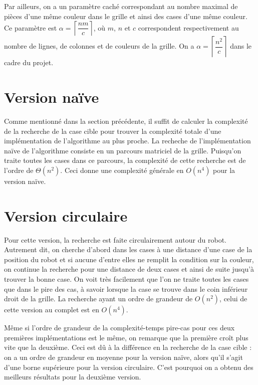 \documentclass[12pt,a4paper]{article}
\begin{document}
Par ailleurs, on a un param\`etre cach\'e correspondant au nombre maximal de 
pi\`eces d'une m\^eme couleur dans le grille et ainsi des cases d'une m\^eme 
couleur. Ce param\`etre est $\alpha = \left \lceil \dfrac{nm}{c} \right 
\rceil$, o\`u $m$, $n$ et $c$ correspondent respectivement au nombre de lignes, 
de colonnes et de couleurs de la grille. On a $\alpha = \left \lceil 
\dfrac{n^2}{c} \right \rceil$ dans le cadre du projet.

\section{Version na\"ive}
Comme mentionn\'e dans la section pr\'ec\'edente, il suffit de 
calculer la complexit\'e de la recherche de la case cible pour trouver la 
complexit\'e totale d'une impl\'ementation de l'algorithme au plus proche.
La recheche de l'impl\'ementation na\"ive de l'algorithme consiste en un 
parcours matriciel de la grille. Puisqu'on traite toutes les cases dans ce 
parcours, la complexit\'e de cette recherche est de l'ordre de $\Theta(n^2)$. 
Ceci donne une complexit\'e g\'en\'erale en $O(n^4)$ pour la version na\"ive.

\section{Version circulaire}
Pour cette version, la recherche est faite circulairement autour du robot. 
Autrement dit, on cherche d'abord dans les cases \`a une distance d'une case de 
la position du robot et si aucune d'entre elles ne remplit la condition 
sur la couleur, on continue la recherche pour une distance de deux 
cases et ainsi de suite jusqu'\`a trouver la bonne case. On voit tr\`es 
facilement que l'on ne traite toutes les cases que dans le pire des cas, 
\`a savoir lorsque la case se trouve dans le coin inf\'erieur droit de la 
grille. La recherche ayant un ordre de grandeur de $O(n^2)$, celui de cette 
version au complet est en $O(n^4)$.

M\^eme si l'ordre de grandeur de la complexit\'e-temps pire-cas pour ces deux 
premi\`eres impl\'ementations est le m\^eme, on remarque que la premi\`ere 
cro\^it plus vite que la deuxi\`eme. Ceci est d\^u \`a la diff\'erence en la 
recherche de la case cible : on a un ordre de grandeur en moyenne 
pour la version na\"ive, alors qu'il s'agit d'une borne sup\'erieure pour la 
version circulaire. C'est pourquoi on a obtenu des meilleurs r\'esultats pour 
la deuxi\`eme version.
\end{document}
